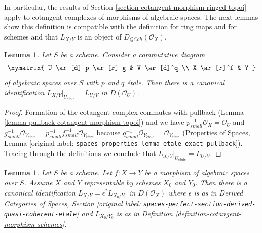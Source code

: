 \documentclass[10pt,a4paper]{article}
\theoremstyle{plain}
\newtheorem{lemma}[subsection]{Lemma}
\theoremstyle{definition}
\theoremstyle{remark}
\numberwithin{equation}{subsection}
\def\etale{{\acute{e}tale}}
\def\QCoh{\mathit{QCoh}}
\begin{document}
\noindent
In particular, the results of
Section \ref{section-cotangent-morphism-ringed-topoi} apply
to cotangent complexes of morphisms of algebraic spaces.
The next lemmas show this definition is compatible with the definition
for ring maps and for schemes and that $L_{X/Y}$ is an
object of $D_\QCoh(\mathcal{O}_X)$.

\begin{lemma}
\label{lemma-etale-localization}
Let $S$ be a scheme. Consider a commutative diagram
$$
\xymatrix{
U \ar[d]_p \ar[r]_g & V \ar[d]^q \\
X \ar[r]^f & Y
}
$$
of algebraic spaces over $S$ with $p$ and $q$ \'etale.
Then there is a canonical identification
$L_{X/Y}|_{U_\etale} = L_{U/V}$ in $D(\mathcal{O}_U)$.
\end{lemma}

\begin{proof}
Formation of the cotangent complex commutes with pullback
(Lemma \ref{lemma-pullback-cotangent-morphism-topoi}) and
we have $p_{small}^{-1}\mathcal{O}_X = \mathcal{O}_U$ and
$g_{small}^{-1}\mathcal{O}_{V_\etale} =
p_{small}^{-1}f_{small}^{-1}\mathcal{O}_{Y_\etale}$
because $q_{small}^{-1}\mathcal{O}_{Y_\etale} =
\mathcal{O}_{V_\etale}$
(Properties of Spaces, Lemma
\textnormal{[original label: \nolinkurl{spaces-properties-lemma-etale-exact-pullback}]}).
Tracing through the definitions we conclude that
$L_{X/Y}|_{U_\etale} = L_{U/V}$.
\end{proof}

\begin{lemma}
\label{lemma-compare-spaces-schemes}
Let $S$ be a scheme. Let $f : X \to Y$ be a morphism of algebraic spaces
over $S$. Assume $X$ and $Y$ representable by schemes $X_0$ and $Y_0$.
Then there is a canonical identification
$L_{X/Y} = \epsilon^*L_{X_0/Y_0}$ in $D(\mathcal{O}_X)$
where $\epsilon$ is as in Derived Categories of Spaces, Section
\textnormal{[original label: \nolinkurl{spaces-perfect-section-derived-quasi-coherent-etale}]}
and $L_{X_0/Y_0}$ is as in
 Definition \ref{definition-cotangent-morphism-schemes}.
\end{lemma}
\end{document}
